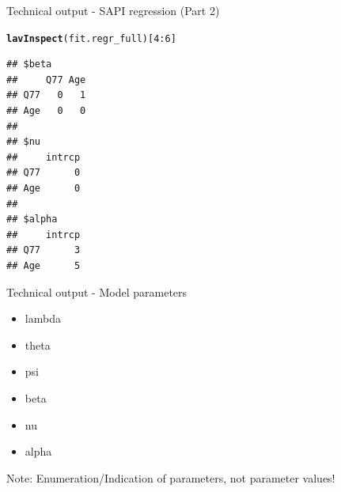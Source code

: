 \documentclass[10pt]{beamer}\usepackage[]{graphicx}\usepackage[]{xcolor}
\makeatletter
\newcommand{\hlnum}[1]{\textcolor[rgb]{0.686,0.059,0.569}{#1}}%
\newcommand{\hlopt}[1]{\textcolor[rgb]{0,0,0}{#1}}%
\newcommand{\hlstd}[1]{\textcolor[rgb]{0.345,0.345,0.345}{#1}}%
\newcommand{\hlkwd}[1]{\textcolor[rgb]{0.737,0.353,0.396}{\textbf{#1}}}%
\newenvironment{kframe}{%
 \def\at@end@of@kframe{}%
 \ifinner\ifhmode%
  \def\at@end@of@kframe{\end{minipage}}%
  \begin{minipage}{\columnwidth}%
 \fi\fi%
 \def\FrameCommand##1{\hskip\@totalleftmargin \hskip-\fboxsep
 \colorbox{shadecolor}{##1}\hskip-\fboxsep
     \hskip-\linewidth \hskip-\@totalleftmargin \hskip\columnwidth}%
 \MakeFramed {\advance\hsize-\width
   \@totalleftmargin\z@ \linewidth\hsize
   \@setminipage}}%
 {\par\unskip\endMakeFramed%
 \at@end@of@kframe}
\newenvironment{knitrout}{}{} %
\makeatother
\begin{document}
%
\begin{frame}[fragile]{Technical output - SAPI regression (Part 2)}
\begin{knitrout}
\color{fgcolor}\begin{kframe}
\begin{alltt}
\hlkwd{lavInspect}\hlstd{(fit.regr_full)[}\hlnum{4}\hlopt{:}\hlnum{6}\hlstd{]}
\end{alltt}
\begin{verbatim}
## $beta
##     Q77 Age
## Q77   0   1
## Age   0   0
## 
## $nu
##     intrcp
## Q77      0
## Age      0
## 
## $alpha
##     intrcp
## Q77      3
## Age      5
\end{verbatim}
\end{kframe}
\end{knitrout}
\end{frame}
%
\begin{frame}[fragile]{Technical output - Model parameters}

\begin{itemize}
\item lambda
\item theta
\item psi
\item beta
\item nu
\item alpha
\end{itemize}

\vspace{5mm}

Note: Enumeration/Indication of parameters, not parameter values!

\end{frame}
%
\end{document}
